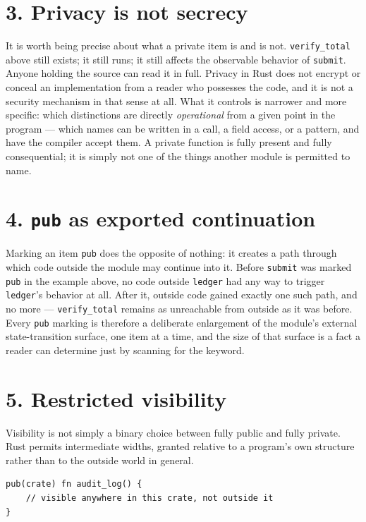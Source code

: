 \documentclass[11pt]{book}
\begin{document}
\section*{3. Privacy is not secrecy}

It is worth being precise about what a private item is and is not. \texttt{verify\_total} above still exists; it still runs; it still affects the observable behavior of \texttt{submit}. Anyone holding the source can read it in full. Privacy in Rust does not encrypt or conceal an implementation from a reader who possesses the code, and it is not a security mechanism in that sense at all. What it controls is narrower and more specific: which distinctions are directly \emph{operational} from a given point in the program --- which names can be written in a call, a field access, or a pattern, and have the compiler accept them. A private function is fully present and fully consequential; it is simply not one of the things another module is permitted to name.

\section*{4. \texttt{pub} as exported continuation}

Marking an item \texttt{pub} does the opposite of nothing: it creates a path through which code outside the module may continue into it. Before \texttt{submit} was marked \texttt{pub} in the example above, no code outside \texttt{ledger} had any way to trigger \texttt{ledger}'s behavior at all. After it, outside code gained exactly one such path, and no more --- \texttt{verify\_total} remains as unreachable from outside as it was before. Every \texttt{pub} marking is therefore a deliberate enlargement of the module's external state-transition surface, one item at a time, and the size of that surface is a fact a reader can determine just by scanning for the keyword.

\section*{5. Restricted visibility}

Visibility is not simply a binary choice between fully public and fully private. Rust permits intermediate widths, granted relative to a program's own structure rather than to the outside world in general.

\begin{lstlisting}
pub(crate) fn audit_log() {
    // visible anywhere in this crate, not outside it
}
\end{lstlisting}
\end{document}
